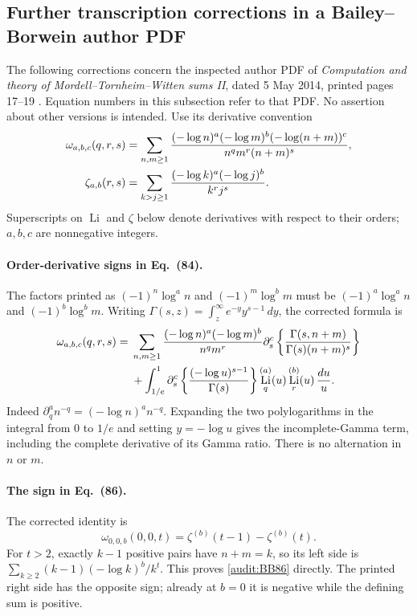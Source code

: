 \documentclass[11pt,a4paper]{article}
\theoremstyle{definition}
\theoremstyle{remark}
\DeclareMathOperator{\Li}{Li}
\numberwithin{equation}{section}
\begin{document}


\subsection{Further transcription corrections in a Bailey--Borwein author PDF}
\label{audit:BB2014}

The following corrections concern the inspected author PDF of
\emph{Computation and theory of Mordell--Tornheim--Witten sums II},
dated 5 May 2014, printed pages 17--19 \cite{BB2014}. Equation numbers in
this subsection refer to that PDF. No assertion about other versions
is intended. Use its derivative convention
\begin{align}
 \omega_{a,b,c}(q,r,s)
 &=\sum_{n,m\ge1}
   \frac{(-\log n)^a(-\log m)^b(-\log(n+m))^c}
        {n^q m^r(n+m)^s},\notag\\
 \zeta_{a,b}(r,s)
 &=\sum_{k>j\ge1}\frac{(-\log k)^a(-\log j)^b}{k^rj^s}.
 \label{audit:BB-definitions}
\end{align}
Superscripts on $\Li$ and $\zeta$ below denote derivatives with respect
to their orders; $a,b,c$ are nonnegative integers.

\paragraph{Order-derivative signs in Eq.~(84).}
The factors printed as $(-1)^n\log^a n$ and $(-1)^m\log^b m$
must be $(-1)^a\log^a n$ and $(-1)^b\log^b m$.
Writing $\Gamma(s,z)=\int_z^\infty e^{-y}y^{s-1}\,dy$, the corrected
formula is
\begin{align}
 \omega_{a,b,c}(q,r,s)
 ={}&\sum_{n,m\ge1}\frac{(-\log n)^a(-\log m)^b}{n^q m^r}
     \partial_s^c\left\{
       \frac{\Gamma(s,n+m)}{\Gamma(s)(n+m)^s}\right\}\notag\\
 &+\int_{1/e}^{1}
    \partial_s^c\left\{\frac{(-\log u)^{s-1}}{\Gamma(s)}\right\}
    \Li_q^{(a)}(u)\Li_r^{(b)}(u)\,\frac{du}{u}.
 \label{audit:BB84}
\end{align}
Indeed $\partial_q^a n^{-q}=(-\log n)^a n^{-q}$.
Expanding the two polylogarithms in the integral from $0$ to $1/e$
and setting $y=-\log u$ gives the incomplete-Gamma term, including
the complete derivative of its Gamma ratio. There is no alternation
in $n$ or $m$.

\paragraph{The sign in Eq.~(86).}
The corrected identity is
\begin{equation}
 \omega_{0,0,b}(0,0,t)
 =\zeta^{(b)}(t-1)-\zeta^{(b)}(t).
 \label{audit:BB86}
\end{equation}
For $t>2$, exactly $k-1$ positive pairs have $n+m=k$, so its left
side is $\sum_{k\ge2}(k-1)(-\log k)^b/k^t$. This proves
\eqref{audit:BB86} directly. The printed right side has the opposite
sign; already at $b=0$ it is negative while the defining sum is positive.
\end{document}

